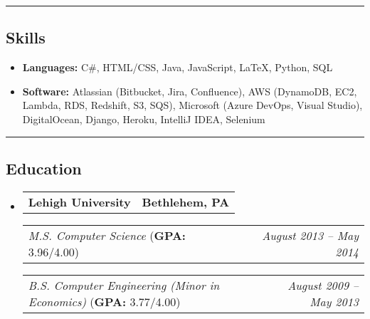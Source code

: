 \documentclass[11pt,letterpaper]{article}
\makeatletter
\newcommand{\headerrow}[2]
{\begin{tabular*}{\linewidth}{l@{\extracolsep{\fill}}r}
#1 &
#2 \\
\end{tabular*}}
\makeatother
\begin{document}
\hrule
\vspace{-1em}
\subsection*{\Large Skills}

\begin{itemize}[leftmargin=1em,noitemsep]
	\item \textbf{Languages:}
	      C\#, HTML/CSS, Java, JavaScript, \LaTeX, Python, SQL
	\item \textbf{Software:}
	      Atlassian (Bitbucket, Jira, Confluence), AWS (DynamoDB, EC2, Lambda, RDS, Redshift, S3, SQS), Microsoft (Azure DevOps, Visual Studio), DigitalOcean, Django, Heroku, IntelliJ IDEA, Selenium
\end{itemize}

\hrule
\vspace{-1em}
\subsection*{\Large Education}

\begin{itemize}[leftmargin=1em]
	\parskip=0.1em
		
	\item
	      \headerrow
	      {\textbf{Lehigh University}}
	      {\textbf{Bethlehem, PA}}
	      \headerrow
	      {\emph{M.S. Computer Science} (\textbf{GPA:} 3.96/4.00)}
	      {\emph{August 2013 -- May 2014}}
	      \headerrow
	      {\emph{B.S. Computer Engineering (Minor in Economics)} (\textbf{GPA:} 3.77/4.00)}
	      {\emph{August 2009 -- May 2013}}
	      	      
\end{itemize}
\end{document}
